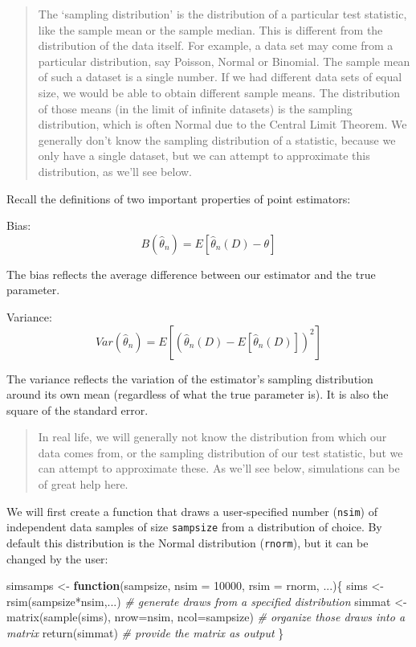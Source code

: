 \documentclass[
]{book}
\newenvironment{Shaded}{\begin{snugshade}}{\end{snugshade}}
\newcommand{\AttributeTok}[1]{\textcolor[rgb]{0.77,0.63,0.00}{#1}}
\newcommand{\CommentTok}[1]{\textcolor[rgb]{0.56,0.35,0.01}{\textit{#1}}}
\newcommand{\ControlFlowTok}[1]{\textcolor[rgb]{0.13,0.29,0.53}{\textbf{#1}}}
\newcommand{\DecValTok}[1]{\textcolor[rgb]{0.00,0.00,0.81}{#1}}
\newcommand{\FunctionTok}[1]{\textcolor[rgb]{0.00,0.00,0.00}{#1}}
\newcommand{\NormalTok}[1]{#1}
\newcommand{\OtherTok}[1]{\textcolor[rgb]{0.56,0.35,0.01}{#1}}
\newcommand{\SpecialCharTok}[1]{\textcolor[rgb]{0.00,0.00,0.00}{#1}}
\begin{document}
\begin{quote}
The `sampling distribution' is the distribution of a particular test statistic, like the sample mean or the sample median. This is different from the distribution of the data itself. For example, a data set may come from a particular distribution, say Poisson, Normal or Binomial. The sample mean of such a dataset is a single number. If we had different data sets of equal size, we would be able to obtain different sample means. The distribution of those means (in the limit of infinite datasets) is the sampling distribution, which is often Normal due to the Central Limit Theorem. We generally don't know the sampling distribution of a statistic, because we only have a single dataset, but we can attempt to approximate this distribution, as we'll see below.
\end{quote}

Recall the definitions of two important properties of point estimators:

Bias: \[B(\hat\theta_n) =  E[\hat\theta_n(D) - \theta] \]

The bias reflects the average difference between our estimator and the true parameter.

Variance: \[Var(\hat\theta_n) =  E[ (\hat\theta_n(D) - E[\hat\theta_n(D)] )^2] \]

The variance reflects the variation of the estimator's sampling distribution around its own mean (regardless of what the true parameter is). It is also the square of the standard error.

\begin{quote}
In real life, we will generally not know the distribution from which our data comes from, or the sampling distribution of our test statistic, but we can attempt to approximate these. As we'll see below, simulations can be of great help here.
\end{quote}

We will first create a function that draws a user-specified number (\texttt{nsim}) of independent data samples of size \texttt{sampsize} from a distribution of choice. By default this distribution is the Normal distribution (\texttt{rnorm}), but it can be changed by the user:

\begin{Shaded}
\begin{Highlighting}[]
\NormalTok{simsamps }\OtherTok{\textless{}{-}} \ControlFlowTok{function}\NormalTok{(sampsize, }\AttributeTok{nsim =} \DecValTok{10000}\NormalTok{, }\AttributeTok{rsim =}\NormalTok{ rnorm, ...)\{}
\NormalTok{  sims }\OtherTok{\textless{}{-}} \FunctionTok{rsim}\NormalTok{(sampsize}\SpecialCharTok{*}\NormalTok{nsim,...) }\CommentTok{\# generate draws from a specified distribution}
\NormalTok{  simmat }\OtherTok{\textless{}{-}} \FunctionTok{matrix}\NormalTok{(}\FunctionTok{sample}\NormalTok{(sims), }\AttributeTok{nrow=}\NormalTok{nsim, }\AttributeTok{ncol=}\NormalTok{sampsize) }\CommentTok{\# organize those draws into a matrix}
  \FunctionTok{return}\NormalTok{(simmat) }\CommentTok{\# provide the matrix as output}
\NormalTok{\}}
\end{Highlighting}
\end{Shaded}
\end{document}
